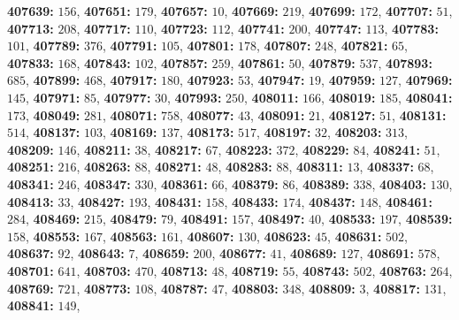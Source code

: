 \textsf{\bfseries 407639:} $156$, \textsf{\bfseries 407651:} $179$, \textsf{\bfseries 407657:} $10$, \textsf{\bfseries 407669:} $219$, \textsf{\bfseries 407699:} $172$, \textsf{\bfseries 407707:} $51$, \textsf{\bfseries 407713:} $208$, \textsf{\bfseries 407717:} $110$, \textsf{\bfseries 407723:} $112$, \textsf{\bfseries 407741:} $200$, \textsf{\bfseries 407747:} $113$, \textsf{\bfseries 407783:} $101$, \textsf{\bfseries 407789:} $376$, \textsf{\bfseries 407791:} $105$, \textsf{\bfseries 407801:} $178$, \textsf{\bfseries 407807:} $248$, \textsf{\bfseries 407821:} $65$, \textsf{\bfseries 407833:} $168$, \textsf{\bfseries 407843:} $102$, \textsf{\bfseries 407857:} $259$, \textsf{\bfseries 407861:} $50$, \textsf{\bfseries 407879:} $537$, \textsf{\bfseries 407893:} $685$, \textsf{\bfseries 407899:} $468$, \textsf{\bfseries 407917:} $180$, \textsf{\bfseries 407923:} $53$, \textsf{\bfseries 407947:} $19$, \textsf{\bfseries 407959:} $127$, \textsf{\bfseries 407969:} $145$, \textsf{\bfseries 407971:} $85$, \textsf{\bfseries 407977:} $30$, \textsf{\bfseries 407993:} $250$, \textsf{\bfseries 408011:} $166$, \textsf{\bfseries 408019:} $185$, \textsf{\bfseries 408041:} $173$, \textsf{\bfseries 408049:} $281$, \textsf{\bfseries 408071:} $758$, \textsf{\bfseries 408077:} $43$, \textsf{\bfseries 408091:} $21$, \textsf{\bfseries 408127:} $51$, \textsf{\bfseries 408131:} $514$, \textsf{\bfseries 408137:} $103$, \textsf{\bfseries 408169:} $137$, \textsf{\bfseries 408173:} $517$, \textsf{\bfseries 408197:} $32$, \textsf{\bfseries 408203:} $313$, \textsf{\bfseries 408209:} $146$, \textsf{\bfseries 408211:} $38$, \textsf{\bfseries 408217:} $67$, \textsf{\bfseries 408223:} $372$, \textsf{\bfseries 408229:} $84$, \textsf{\bfseries 408241:} $51$, \textsf{\bfseries 408251:} $216$, \textsf{\bfseries 408263:} $88$, \textsf{\bfseries 408271:} $48$, \textsf{\bfseries 408283:} $88$, \textsf{\bfseries 408311:} $13$, \textsf{\bfseries 408337:} $68$, \textsf{\bfseries 408341:} $246$, \textsf{\bfseries 408347:} $330$, \textsf{\bfseries 408361:} $66$, \textsf{\bfseries 408379:} $86$, \textsf{\bfseries 408389:} $338$, \textsf{\bfseries 408403:} $130$, \textsf{\bfseries 408413:} $33$, \textsf{\bfseries 408427:} $193$, \textsf{\bfseries 408431:} $158$, \textsf{\bfseries 408433:} $174$, \textsf{\bfseries 408437:} $148$, \textsf{\bfseries 408461:} $284$, \textsf{\bfseries 408469:} $215$, \textsf{\bfseries 408479:} $79$, \textsf{\bfseries 408491:} $157$, \textsf{\bfseries 408497:} $40$, \textsf{\bfseries 408533:} $197$, \textsf{\bfseries 408539:} $158$, \textsf{\bfseries 408553:} $167$, \textsf{\bfseries 408563:} $161$, \textsf{\bfseries 408607:} $130$, \textsf{\bfseries 408623:} $45$, \textsf{\bfseries 408631:} $502$, \textsf{\bfseries 408637:} $92$, \textsf{\bfseries 408643:} $7$, \textsf{\bfseries 408659:} $200$, \textsf{\bfseries 408677:} $41$, \textsf{\bfseries 408689:} $127$, \textsf{\bfseries 408691:} $578$, \textsf{\bfseries 408701:} $641$, \textsf{\bfseries 408703:} $470$, \textsf{\bfseries 408713:} $48$, \textsf{\bfseries 408719:} $55$, \textsf{\bfseries 408743:} $502$, \textsf{\bfseries 408763:} $264$, \textsf{\bfseries 408769:} $721$, \textsf{\bfseries 408773:} $108$, \textsf{\bfseries 408787:} $47$, \textsf{\bfseries 408803:} $348$, \textsf{\bfseries 408809:} $3$, \textsf{\bfseries 408817:} $131$, \textsf{\bfseries 408841:} $149$, 
